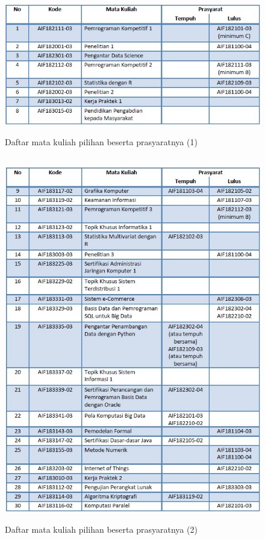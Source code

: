 \begin{figure}[H]
    \centering
    \includegraphics[width=13cm, height=6cm]{Gambar/Prasyarat MK Pilihan 1.jpg}
    \caption{Daftar mata kuliah pilihan beserta prasyaratnya (1)}
    \label{fig:gambar11}
\end{figure}

\begin{figure}[H]
    \centering
    \includegraphics[width=12cm, height=16cm]{Gambar/Prasyarat MK Pilihan 2.jpg}
    \caption{Daftar mata kuliah pilihan beserta prasyaratnya (2)}
    \label{fig:gambar12}
\end{figure}

